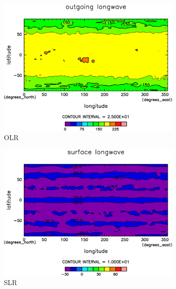 \documentclass[body]{subfiles}
\begin{document}
\begin{figure}[t]
	\centering
	\begin{subfigure}{.4\textwidth}
		\centering
		\includegraphics[width=\columnwidth]{S2000/OLR,time=7300:7665-crop-rotate.pdf}
		\caption{OLR \hmu*{[W/m^{-2}]}}\label{S2000OLR}
	\end{subfigure}
	\begin{subfigure}{.4\textwidth}
		\centering
		\includegraphics[width=\columnwidth]{S2000/SLR,time=7300:7665-crop-rotate.pdf}
		\caption{SLR\hmu*{[W/m^{-2}]}}\label{S2000SLR}
	\end{subfigure}
	\begin{subfigure}{.4\textwidth}
		\centering

\end{subfigure}
\end{figure}
\end{document}
